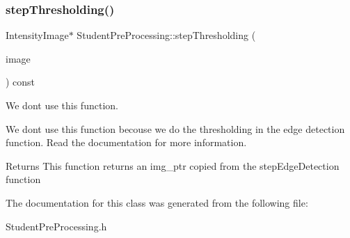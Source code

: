 \subsubsection{\texorpdfstring{step\+Thresholding()}{stepThresholding()}}
{\footnotesize\ttfamily Intensity\+Image$\ast$ Student\+Pre\+Processing\+::step\+Thresholding (\begin{DoxyParamCaption}\item[{const Intensity\+Image \&}]{image }\end{DoxyParamCaption}) const}



We don\textquotesingle{}t use this function. 

We don\textquotesingle{}t use this function becouse we do the thresholding in the edge detection function. Read the documentation for more information.

\begin{DoxyReturn}{Returns}
This function returns an img\+\_\+ptr copied from the step\+Edge\+Detection function 
\end{DoxyReturn}


The documentation for this class was generated from the following file\+:\begin{DoxyCompactItemize}
\item 
Student\+Pre\+Processing.\+h\end{DoxyCompactItemize}
